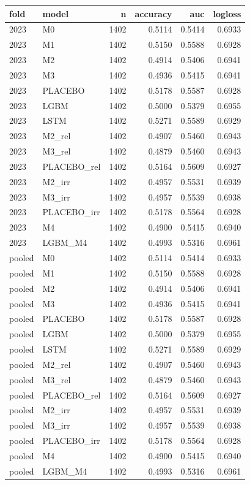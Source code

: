 \begin{tabular}{llrrrr}
\toprule
fold & model & n & accuracy & auc & logloss \\
\midrule
2023 & M0 & 1402 & 0.5114 & 0.5414 & 0.6933 \\
2023 & M1 & 1402 & 0.5150 & 0.5588 & 0.6928 \\
2023 & M2 & 1402 & 0.4914 & 0.5406 & 0.6941 \\
2023 & M3 & 1402 & 0.4936 & 0.5415 & 0.6941 \\
2023 & PLACEBO & 1402 & 0.5178 & 0.5587 & 0.6928 \\
2023 & LGBM & 1402 & 0.5000 & 0.5379 & 0.6955 \\
2023 & LSTM & 1402 & 0.5271 & 0.5589 & 0.6929 \\
2023 & M2\_rel & 1402 & 0.4907 & 0.5460 & 0.6943 \\
2023 & M3\_rel & 1402 & 0.4879 & 0.5460 & 0.6943 \\
2023 & PLACEBO\_rel & 1402 & 0.5164 & 0.5609 & 0.6927 \\
2023 & M2\_irr & 1402 & 0.4957 & 0.5531 & 0.6939 \\
2023 & M3\_irr & 1402 & 0.4957 & 0.5539 & 0.6938 \\
2023 & PLACEBO\_irr & 1402 & 0.5178 & 0.5564 & 0.6928 \\
2023 & M4 & 1402 & 0.4900 & 0.5415 & 0.6940 \\
2023 & LGBM\_M4 & 1402 & 0.4993 & 0.5316 & 0.6961 \\
pooled & M0 & 1402 & 0.5114 & 0.5414 & 0.6933 \\
pooled & M1 & 1402 & 0.5150 & 0.5588 & 0.6928 \\
pooled & M2 & 1402 & 0.4914 & 0.5406 & 0.6941 \\
pooled & M3 & 1402 & 0.4936 & 0.5415 & 0.6941 \\
pooled & PLACEBO & 1402 & 0.5178 & 0.5587 & 0.6928 \\
pooled & LGBM & 1402 & 0.5000 & 0.5379 & 0.6955 \\
pooled & LSTM & 1402 & 0.5271 & 0.5589 & 0.6929 \\
pooled & M2\_rel & 1402 & 0.4907 & 0.5460 & 0.6943 \\
pooled & M3\_rel & 1402 & 0.4879 & 0.5460 & 0.6943 \\
pooled & PLACEBO\_rel & 1402 & 0.5164 & 0.5609 & 0.6927 \\
pooled & M2\_irr & 1402 & 0.4957 & 0.5531 & 0.6939 \\
pooled & M3\_irr & 1402 & 0.4957 & 0.5539 & 0.6938 \\
pooled & PLACEBO\_irr & 1402 & 0.5178 & 0.5564 & 0.6928 \\
pooled & M4 & 1402 & 0.4900 & 0.5415 & 0.6940 \\
pooled & LGBM\_M4 & 1402 & 0.4993 & 0.5316 & 0.6961 \\
\bottomrule
\end{tabular}
